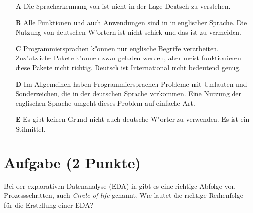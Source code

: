 \documentclass[a4paper, 9pt]{scrartcl}\usepackage[]{graphicx}\usepackage[]{xcolor}
\begin{document}
\begin{enumerate}
\item [\textbf{A} \msquare] Die Spracherkennung von \Rlogo ist nicht in der Lage Deutsch zu verstehen.
\item [\textbf{B} \msquare] Alle Funktionen und auch Anwendungen sind in \Rlogo in englischer Sprache. Die Nutzung von deutschen W{"o}rtern ist nicht schick und das ist zu vermeiden.
\item [\textbf{C} \msquare] Programmiersprachen k{"o}nnen nur englische Begriffe verarbeiten. Zus{"a}tzliche Pakete k{"o}nnen zwar geladen werden, aber meist funktionieren diese Pakete nicht richtig. Deutsch ist International nicht bedeutend genug.
\item [\textbf{D} \msquare] Im Allgemeinen haben Programmiersprachen Probleme mit Umlauten und Sonderzeichen, die in der deutschen Sprache vorkommen. Eine Nutzung der englischen Sprache umgeht dieses Problem auf einfache Art.
\item [\textbf{E} \msquare] Es gibt keinen Grund nicht auch deutsche W{"o}rter zu verwenden. Es ist ein Stilmittel.
\end{enumerate}

\section{Aufgabe \hfill (2 Punkte)}

Bei der explorativen Datenanalyse (EDA) in \Rlogo gibt es eine richtige Abfolge von Prozessschritten, auch \textit{Circle of life} genannt. Wie lautet die richtige Reihenfolge f{\"u}r die Erstellung einer EDA?
\end{document}
